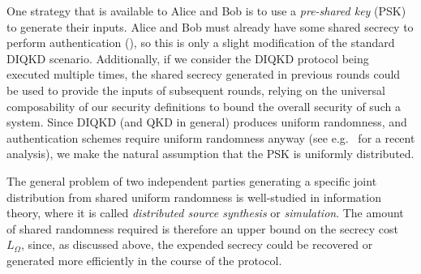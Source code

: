 \documentclass[10pt, a4paper]{article}
\numberwithin{equation}{section} %
\theoremstyle{definition}
\theoremstyle{plain}
\newcommand{\?}{\mathrel{?}} %
\begin{document}
    One strategy that is available to Alice and Bob is to use a \emph{pre-shared key} (PSK) to generate their inputs. Alice and Bob must already have some shared secrecy to perform authentication (), so this is only a slight modification of the standard DIQKD scenario. Additionally, if we consider the DIQKD protocol being executed multiple times, the shared secrecy generated in previous rounds could be used to provide the inputs of subsequent rounds, relying on the universal composability of our security definitions to bound the overall security of such a system. Since DIQKD (and QKD in general) produces uniform randomness, and authentication schemes require uniform randomness anyway (see e.g.~\cite{AuthKeyRecycling} for a recent analysis), we make the natural assumption that the PSK is uniformly distributed.

    The general problem of two independent parties generating a specific joint distribution from shared uniform randomness is well-studied in information theory, where it is called \emph{distributed source synthesis} or \emph{simulation}. The amount of shared randomness required is therefore an upper bound on the secrecy cost \(L_{\Omega}\), since, as discussed above, the expended secrecy could be recovered or generated more efficiently in the course of the protocol.
\end{document}
